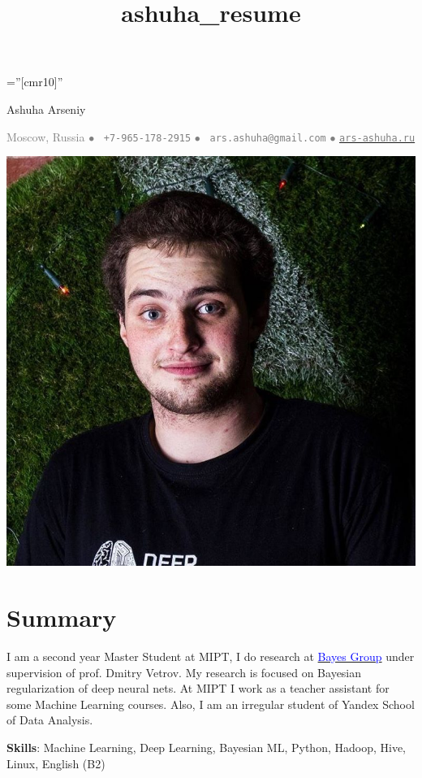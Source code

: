 \documentclass[a4paper,10pt]{article} %
\title{ashuha_resume}
\begin{document}
\pagestyle{empty} %

\font\fb=''[cmr10]'' %
\oddsidemargin=0pt 		%

\begin{center}
	{\huge Ashuha Arseniy}
\end{center}
\begin{center}
\textcolor{gray}{
Moscow, Russia $\bullet$ 
\Mobilefone~\texttt{+7-965-178-2915} $\bullet$ 
\Letter~\textcolor{gray}{\texttt{ars.ashuha@gmail.com}} $\bullet$ \href{https://ars-ashuha.ru/}{\textcolor{gray}{\texttt{ars-ashuha.ru}}}}
\end{center}
\setlength{\columnsep}{-330pt}
\begin{multicols}{2}
\includegraphics[scale=0.13]{img/avatar_rect2}

\section{Summary}
 \vspace{-0.2cm}
 
I am a second year Master Student at MIPT, I do research at \href{bayesgroup.ru}{\textcolor{blue}{Bayes Group}} under supervision of prof. Dmitry Vetrov. My research is focused on Bayesian regularization of deep neural nets. At MIPT I work as a teacher assistant for some Machine Learning courses. Also, I am an irregular student of Yandex School of Data Analysis.
 

\textbf{Skills}: Machine Learning, Deep Learning, Bayesian ML, Python, Hadoop, Hive, Linux, English (B2)

\end{multicols}
\end{document}
